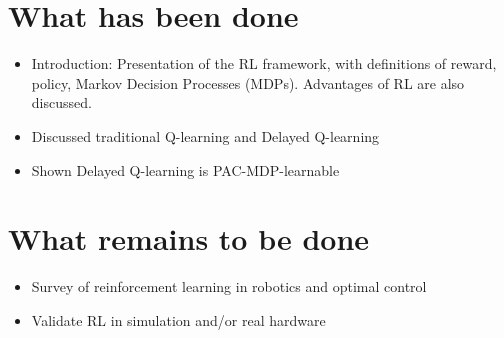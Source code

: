 \documentclass[10pt]{article}
\begin{document}
\section{What has been done}
\begin{itemize}
\item Introduction: Presentation of the RL framework, with definitions of reward, policy, Markov Decision Processes (MDPs). Advantages of RL are also discussed.
\item Discussed traditional Q-learning and Delayed Q-learning
\item Shown Delayed Q-learning is PAC-MDP-learnable
\end{itemize}


\section{What remains to be done}
\begin{itemize}
\item Survey of reinforcement learning in robotics and optimal control 
\item Validate RL in simulation and/or real hardware
\end{itemize}

\nocite{yang_multiagent_2004}
\nocite{kim_autonomous_2003}
\nocite{mohri_foundations_2012}


\newpage
{}





\end{document}
